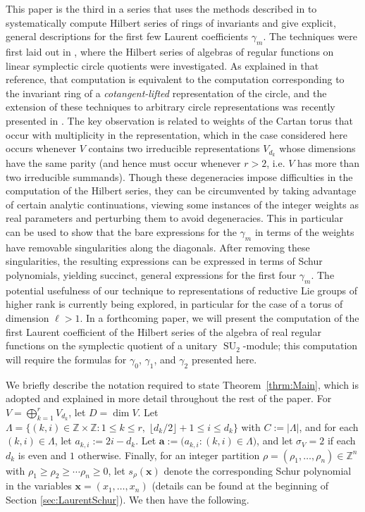 \documentclass{amsart}
\theoremstyle{definition}
\theoremstyle{remark}
\newcommand{\Z}{\mathbb{Z}}
\newcommand{\SU}{\operatorname{SU}}
\newcommand{\bs}{\boldsymbol}
\begin{document}
This paper is the third in a series that uses the methods described in
\cite[Section~4.6.1 and 4.6.4]{DerskenKemperBook} to systematically compute Hilbert series
of rings of invariants and give explicit, general descriptions for the first few Laurent coefficients $\gamma_m$.
The techniques were first laid out in \cite{HerbigSeaton}, where the Hilbert series of algebras of
regular functions on linear symplectic circle quotients were investigated. As explained in that reference,
that computation is equivalent to the computation corresponding to the invariant ring of a \emph{cotangent-lifted} representation of the circle, and the extension of these techniques to arbitrary circle representations was recently
presented in \cite{CowieHerbigSeatonHerden}. The key observation is related to weights of the Cartan torus that occur
with multiplicity in the representation, which in the case considered here occurs whenever $V$ contains two irreducible
representations $V_{d_k}$ whose dimensions have the same parity (and hence must occur whenever $r > 2$, i.e. $V$ has more
than two irreducible summands). Though these
degeneracies impose difficulties in the computation of the Hilbert series, they can be circumvented by taking
advantage of certain analytic continuations, viewing some instances of the integer weights as real parameters and
perturbing them to avoid degeneracies. This in particular can be used to show that the bare expressions
for the $\gamma_m$ in terms of the weights have removable singularities along the diagonals. After removing these
singularities, the resulting expressions can be expressed in terms of Schur polynomials, yielding succinct,
general expressions for the first four $\gamma_m$.
The potential usefulness of our technique to representations of reductive Lie groups of higher rank is currently
being explored, in particular for the case of a torus of dimension $\ell>1$. In a forthcoming paper, we will present
the computation of the first Laurent coefficient of the Hilbert series of the algebra of real regular functions on
the symplectic quotient of a unitary $\SU_2$-module; this computation will require the formulas for $\gamma_0$,
$\gamma_1$, and $\gamma_2$ presented here.

We briefly describe the notation required to state Theorem~\ref{thrm:Main}, which is adopted and explained in more detail
throughout the rest of the paper.
For $V = \bigoplus_{k=1}^r V_{d_k}$, let $D = \dim V$. Let
$\Lambda = \{(k,i)\in \Z\times\Z : 1 \leq k \leq r, \; \lfloor d_k/2 \rfloor + 1 \leq  i \leq d_k \}$ with $C:=|\Lambda|$,
and for each $(k,i)\in\Lambda$, let $a_{k,i} := 2i - d_k$. Let $\bs{a} := \big(a_{k,i} : (k,i)\in\Lambda\big)$,
and let $\sigma_V = 2$ if each $d_k$ is even and $1$ otherwise. Finally, for an integer partition
$\rho = (\rho_1,\ldots,\rho_n) \in \Z^n$ with $\rho_1\geq\rho_2\geq\cdots\rho_n\geq 0$, let
$s_\rho(\bs{x})$ denote the corresponding Schur polynomial in the variables $\bs{x}=(x_1,\ldots,x_n)$
(details can be found at the beginning of Section \ref{sec:LaurentSchur}).
We then have the following.
\end{document}
